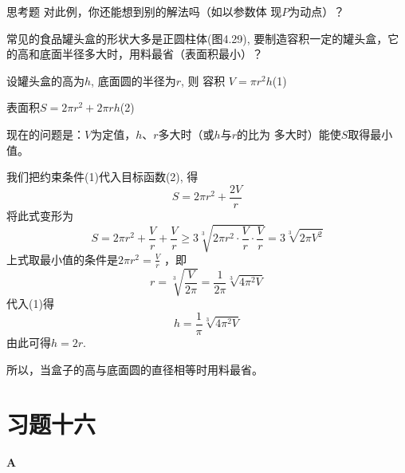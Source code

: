 \begin{thm}
  {思考题} 对此例，你还能想到别的解法吗（如以参数体
现$P$为动点）？  
\end{thm}

\begin{example}
    常见的食品罐头盒的形状大多是正圆柱体(图4.29), 要制造容积一定的罐头盒，它的高和底面半径多大时，用料最省（表面积最小）？
\end{example}

\begin{figure}[htp]
    \centering
{}
    \caption{}
\end{figure}

\begin{solution}
设罐头盒的高为$h$, 底面圆的半径为$r$, 则
容积
$V=\pi r^2 h$\hfill (1)

表面积$S=2\pi r^2+2\pi rh$\hfill (2)

现在的问题是：$V$为定值，$h$、$r$多大时（或$h$与$r$的比为
多大时）能使$S$取得最小值。

我们把约束条件(1)代入目标函数(2), 得
\[S=2\pi r^2+\frac{2V}{r}\]
将此式变形为
\[S=2\pi r^2+\frac{V}{r}+\frac{V}{r}\ge 3\sqrt[3]{2\pi r^2\cdot \frac{V}{r}\cdot \frac{V}{r}}=3\sqrt[3]{2\pi V^2}\]
上式取最小值的条件是$2\pi r^2=\frac{V}{r}$
，即
\[r=\sqrt[3]{\frac{V}{2\pi}}=\frac{1}{2\pi}\sqrt[3]{4\pi^2 V}\]
代入(1)得
\[h=\frac{1}{\pi}\sqrt[3]{4\pi^2 V}\]
由此可得$h=2r$.

所以，当盒子的高与底面圆的直径相等时用料最省。
\end{solution}



\section*{习题十六}
\begin{center}
    \bfseries A
\end{center}

